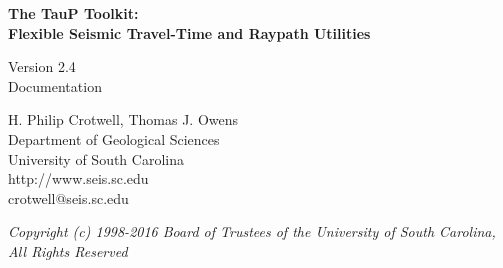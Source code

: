
\begin{titlepage}
\begin{center}

\vspace{2in}

\LARGE
\textbf{
The TauP Toolkit: \\
Flexible Seismic Travel-Time and Raypath Utilities \\
}

\large
Version 2.4 \\
Documentation 

\vspace{3in}

H. Philip Crotwell, Thomas J. Owens \\
Department of Geological Sciences \\
University of South Carolina \\
http://www.seis.sc.edu \\
crotwell@seis.sc.edu 

\vspace{3in}

\textit{
\normalsize 
Copyright (c) 1998-2016 Board of Trustees of the University of South Carolina, \\
All Rights Reserved
\normalsize}

\end{center}
\end{titlepage}
